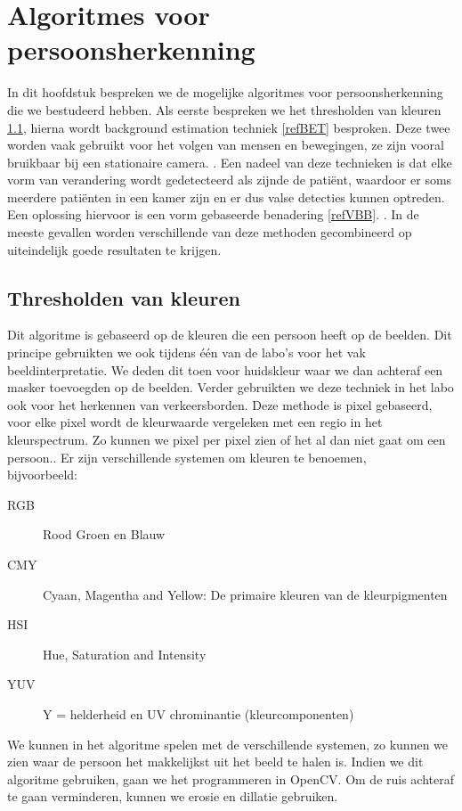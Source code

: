 \section{Algoritmes voor persoonsherkenning}
\label{refAVPH}
In dit hoofdstuk bespreken we de mogelijke algoritmes voor persoonsherkenning die we bestudeerd hebben. Als eerste bespreken we het thresholden van kleuren \ref{refTVK}, hierna wordt background estimation techniek \ref{refBET} besproken. Deze twee worden vaak gebruikt voor het volgen van mensen en bewegingen, ze zijn vooral bruikbaar bij een stationaire camera. \cite{bibIRC}. Een nadeel van deze technieken is dat elke vorm van verandering wordt gedetecteerd als zijnde de pati\"ent, waardoor er soms meerdere pati\"enten in een kamer zijn en er dus valse detecties kunnen optreden. Een oplossing hiervoor is een vorm gebaseerde benadering \ref{refVBB}. \cite{bibIRC}. In de meeste gevallen worden verschillende van deze methoden gecombineerd op uiteindelijk goede resultaten te krijgen. 

\subsection{Thresholden van kleuren}
\label{refTVK}
Dit algoritme is gebaseerd op de kleuren die een persoon heeft op de beelden. Dit principe gebruikten we ook tijdens \'e\'en van de labo's voor het vak beeldinterpretatie. We deden dit toen voor huidskleur waar we dan achteraf een masker toevoegden op de beelden. Verder gebruikten we deze techniek in het labo ook voor het herkennen van verkeersborden. Deze methode is pixel gebaseerd, voor elke pixel wordt de kleurwaarde vergeleken met een regio in het kleurspectrum. Zo kunnen we pixel per pixel zien of het al dan niet gaat om een persoon.\cite{bibTHK}. Er zijn verschillende systemen om kleuren te benoemen,\\ bijvoorbeeld:
\begin{description}
	\item[RGB] Rood Groen en Blauw
	\item [CMY] Cyaan, Magentha and Yellow: De primaire kleuren van de kleurpigmenten
	\item [HSI] Hue, Saturation and Intensity
	\item [YUV] Y = helderheid en UV chrominantie (kleurcomponenten)
\end{description}
We kunnen in het algoritme spelen met de verschillende systemen, zo kunnen we zien waar de persoon het makkelijkst uit het beeld te halen is. Indien we dit algoritme gebruiken, gaan we het programmeren in OpenCV. Om de ruis achteraf te gaan verminderen, kunnen we erosie en dillatie gebruiken.
 

